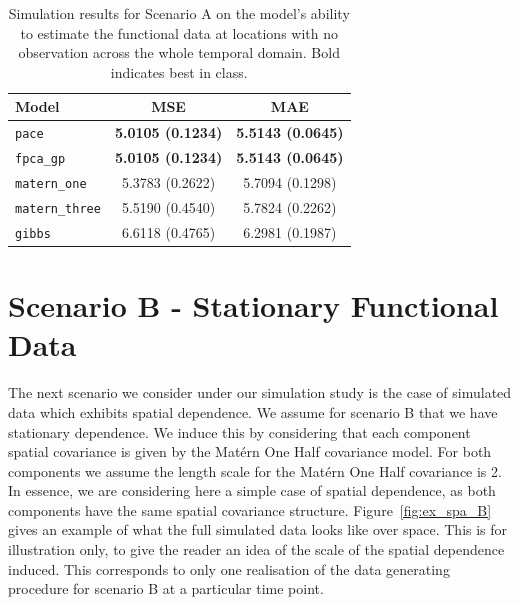 \begin{table}
	\caption[Simulation results for Scenario A on test data.]{Simulation results for Scenario A on the model's ability to estimate the functional data at locations with no observation across the whole temporal domain. Bold indicates best in class.}
	\centering
	\label{tab:test_A}
	\begin{tabular}{lcc}
		\toprule
		\textbf{Model} & \textbf{MSE} & \textbf{MAE} \\
		\midrule
		\verb*|pace| & \textbf{5.0105 (0.1234)} & \textbf{5.5143 (0.0645)} \\
		\verb*|fpca_gp| & \textbf{5.0105 (0.1234)} & \textbf{5.5143 (0.0645)} \\
		\verb*|matern_one| & 5.3783	(0.2622) & 5.7094 (0.1298) \\
		\verb*|matern_three| & 5.5190 (0.4540) & 5.7824	(0.2262) \\
		\verb*|gibbs| & 6.6118 (0.4765) & 6.2981 (0.1987)\\
		\bottomrule
	\end{tabular}
\end{table}

\section{Scenario B - Stationary Functional Data \label{sec:sim_B}}
The next scenario we consider under our simulation study is the case of simulated data which exhibits spatial dependence.
We assume for scenario B that we have stationary dependence.
We induce this by considering that each component spatial covariance is given by the Mat\'ern One Half covariance model.
For both components we assume the length scale for the Mat\'ern One Half covariance is 2.
In essence, we are considering here a simple case of spatial dependence, as both components have the same spatial covariance structure.
Figure~\ref{fig:ex_spa_B} gives an example of what the full simulated data looks like over space.
This is for illustration only, to give the reader an idea of the scale of the spatial dependence induced.
This corresponds to only one realisation of the data generating procedure for scenario B at a particular time point.

